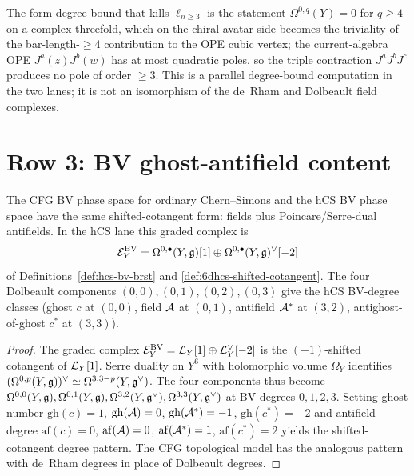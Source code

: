 \begin{remark}
\label{rem:cfg-row-2-cubic-bound}
The form-degree bound that kills $\ell_{n\geq 3}$ is the statement
$\Omega^{0,q}(Y) = 0$ for $q\geq 4$ on a complex threefold, which on
the chiral-avatar side becomes the triviality of the bar-length-$\geq 4$
contribution to the OPE cubic vertex; the current-algebra OPE
$J^a(z)J^b(w)$ has at most quadratic poles, so the triple contraction
$J^a J^b J^c$ produces no pole of order $\geq 3$. This is a parallel
degree-bound computation in the two lanes; it is not an isomorphism of
the de~Rham and Dolbeault field complexes.
\end{remark}

\section{Row 3: BV ghost-antifield content}
\label{sec:cfg-row-3-ghost-antifield}

\begin{theorem}
\label{thm:cfg-row-3}
The CFG BV phase space for ordinary Chern--Simons and the hCS BV phase
space have the same shifted-cotangent form: fields plus
Poincare/Serre-dual antifields. In the hCS lane this graded complex is
\[
 \mathcal{E}^{\mathrm{BV}}_Y
 = \Omega^{0,\bullet}(Y,\mathfrak{g})[1]\oplus \Omega^{0,\bullet}(Y,\mathfrak{g})^\vee[-2]
\]
of Definitions~\ref{def:hcs-bv-brst} and
\ref{def:6dhcs-shifted-cotangent}. The four Dolbeault
components $(0,0), (0,1), (0,2), (0,3)$ give the hCS BV-degree classes
(ghost $c$ at $(0,0)$, field $\mathcal{A}$ at $(0,1)$, antifield $\mathcal{A}^*$ at
$(3,2)$, antighost-of-ghost $c^*$ at $(3,3)$).
\end{theorem}

\begin{proof}
The graded complex $\mathcal{E}^{\mathrm{BV}}_Y = \mathcal{L}_Y[1]\oplus \mathcal{L}_Y^\vee[-2]$ is the
$(-1)$-shifted cotangent of $\mathcal{L}_Y[1]$. Serre duality on $Y^6$ with
holomorphic volume $\Omega_Y$ identifies
$(\Omega^{0,p}(Y,\mathfrak{g}))^\vee\simeq \Omega^{3,3-p}(Y,\mathfrak{g}^\vee)$. The
four components thus become
$\Omega^{0,0}(Y,\mathfrak{g}),\Omega^{0,1}(Y,\mathfrak{g}),\Omega^{3,2}(Y,\mathfrak{g}^\vee),\Omega^{3,3}(Y,\mathfrak{g}^\vee)$
at BV-degrees $0, 1, 2, 3$. Setting
ghost number $\mathrm{gh}(c) = 1$, $\mathrm{gh}(\mathcal{A}) = 0$,
$\mathrm{gh}(\mathcal{A}^*) = -1$, $\mathrm{gh}(c^*) = -2$ and antifield degree
$\mathrm{af}(c) = 0$, $\mathrm{af}(\mathcal{A}) = 0$, $\mathrm{af}(\mathcal{A}^*) = 1$,
$\mathrm{af}(c^*) = 2$ yields the shifted-cotangent degree pattern.
The CFG topological model has the analogous pattern with de~Rham
degrees in place of Dolbeault degrees.
\end{proof}

